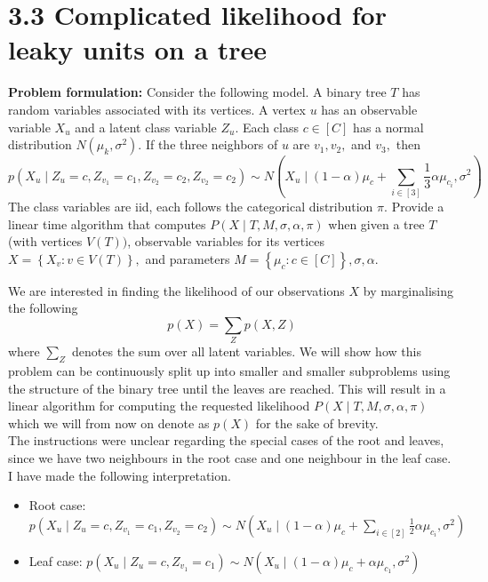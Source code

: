 \section*{3.3 Complicated likelihood for leaky units on a tree}
\begin{tcolorbox}
  \textbf{Problem formulation:} Consider the following model. A binary tree $T$ has random variables associated with its vertices. A vertex $u$ has an observable variable $X_{u}$ and a latent class variable $Z_{u} .$ Each class $c \in[C]$ has a normal distribution $N\left(\mu_{k}, \sigma^{2}\right) .$ If the three neighbors of $u$ are $v_{1}, v_{2},$ and $v_{3},$ then
  $$
  p\left(X_{u} \mid Z_{u}=c, Z_{v_{1}}=c_{1}, Z_{v_{2}}=c_{2}, Z_{v_{2}}=c_{2}\right) \sim N\left(X_{u} \mid(1-\alpha) \mu_{c}+\sum_{i \in[3]} \frac{1}{3} \alpha \mu_{c_{i}}, \sigma^{2}\right)
  $$
  The class variables are iid, each follows the categorical distribution $\pi .$ Provide a linear time algorithm that computes $P(X \mid T, M, \sigma, \alpha, \pi)$ when given a tree $T$ (with vertices $V(T))$, observable variables for its vertices $X=\left\{X_{v}: v \in V(T)\right\},$ and parameters $M=\left\{\mu_{c}: c \in[C]\right\}, \sigma, \alpha .$
\end{tcolorbox}
We are interested in finding the likelihood of our observations $X$ by marginalising the following
\begin{equation}
  p(X) = \sum_Z p(X,Z)
\end{equation}
where $\sum_Z$ denotes the sum over all latent variables. We will show how this problem can be continuously split up into smaller and smaller subproblems using the structure of the binary tree until the leaves are reached. This will result in a linear algorithm for computing the requested likelihood $P(X \mid T, M, \sigma, \alpha, \pi)$ which we will from now on denote as $p(X)$ for the sake of brevity.\\

The instructions were unclear regarding the special cases of the root and leaves, since we have two neighbours in the root case and one neighbour in the leaf case. I have made the following interpretation.

\begin{itemize}
  \item Root case: $p(X_{u} \mid Z_{u}=c, Z_{v_{1}}=c_{1}, Z_{v_{2}}=c_{2}) \sim N\left(X_{u} \mid(1-\alpha) \mu_{c}+\sum_{i \in[2]} \frac{1}{2} \alpha \mu_{c_{i}}, \sigma^{2}\right)$
  \item Leaf case: $p(X_{u} \mid Z_{u}=c, Z_{v_{1}}=c_{1}) \sim N\left(X_{u} \mid(1-\alpha) \mu_{c} + \alpha \mu_{c_1}, \sigma^{2}\right)$
\end{itemize}

